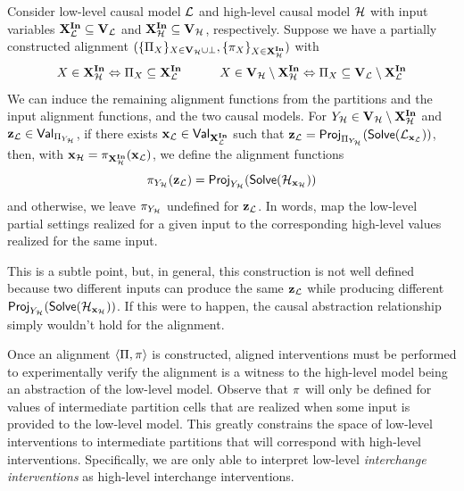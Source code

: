 \documentclass[twoside,11pt]{article}
\begin{document}
\begin{remark}\label{def:interchangealign}
Consider  low-level causal model $\lowmodel$ and high-level causal model $\highmodel$ with input variables $\inputvars_{\lowmodel} \subseteq \allvars_{\lowmodel}$ and $\inputvars_{\highmodel} \subseteq \allvars_{\highmodel}$, respectively. Suppose we have a partially constructed alignment $(\{\cellpart_\onevar\}_{\onevar \in \allvars_{\highmodel} \cup \bot}, \{\cellfunc_\onevar\}_{\onevar \in \inputvars_{\highmodel}})$ with
\[
\onevar \in \inputvars_{\highmodel} \Leftrightarrow \cellpart_\onevar \subseteq \inputvars_{\lowmodel} \;\;\;\;\;\;\;\;\;\;\;
  \onevar \in \allvars_{\highmodel} \setminus \inputvars_{\highmodel} \Leftrightarrow \cellpart_\onevar \subseteq \allvars_{\lowmodel} \setminus  \inputvars_{\lowmodel} \]
We can induce the remaining alignment functions from the partitions and the input alignment functions, and the two causal models. For $\onevarr_{\highmodel} \in \allvars_{\highmodel} \setminus \inputvars_{\highmodel}$ and $\psettt_{\lowmodel} \in \values{\cellpart_{\onevarr_{\highmodel}}}$, if there exists $\pset_{\lowmodel} \in \values{\inputvars_{\lowmodel}}$ such that $\psettt_{\lowmodel} = \project{\sols(\lowmodel_{\pset_{\lowmodel}})}{\cellpart_{\onevarr_{\highmodel}}}$,
 then, with $\pset_{\highmodel} = \cellfunc_{\inputvars_{\highmodel}}(\pset_{\lowmodel})$, we define the alignment functions  
\[\cellfunc_{\onevarr_{\highmodel}}(\psettt_{\lowmodel}) =
\project{\sols(\highmodel_{\pset_{\highmodel}})}{\onevarr_{\highmodel}}
\]
and otherwise, we leave $\cellfunc_{\onevarr_{\highmodel}}$ undefined for $\psettt_{\lowmodel}$.
In words, map the low-level partial settings realized for a given input to the corresponding high-level values realized for the same input.

This is a subtle point, but, in general, this construction is not well defined because two different inputs can produce the same $\psettt_{\lowmodel}$ while producing different $\project{\sols(\highmodel_{\pset_{\highmodel}})}{\onevarr_{\highmodel}}$. If this were to happen, the causal abstraction relationship simply wouldn't hold for the alignment.
\end{remark}



Once an alignment $\langle \cellpart, \cellfunc \rangle$ is constructed, aligned interventions must be performed to experimentally verify the alignment is a witness to the high-level model being an abstraction of the low-level model.  Observe that $\cellfunc$ will only be defined for values of intermediate partition cells that are realized when some input is provided to the low-level model. This greatly constrains the space of low-level interventions to intermediate partitions that will correspond with high-level interventions. Specifically, we are only able to interpret low-level \textit{interchange interventions} as high-level interchange interventions. 
\end{document}
